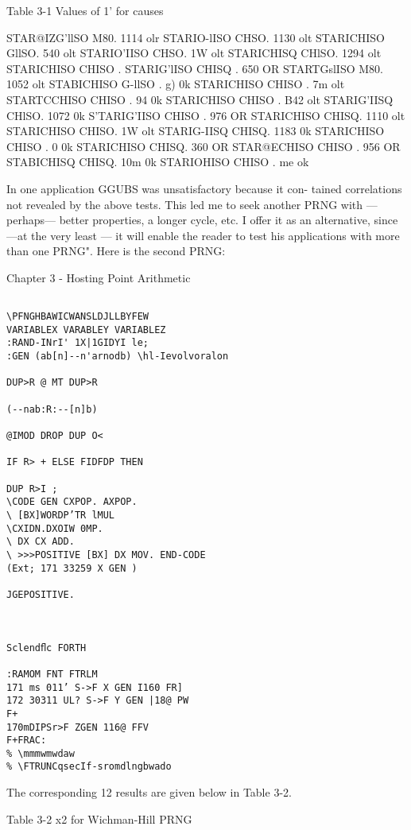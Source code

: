 Table 3-1 Values of 1' for causes

 

STAR@IZG'llSO M80. 1114 olr STARIO-lISO CHSO. 1130 olt
STARICHISO GllSO. 540 olt STARIO'IISO CHSO. 1W olt
STARICHISQ CHlSO. 1294 olt STARICHISO CHISO . %
STARIG'lISO CHISQ . 650 OR STARTGslISO M80. 1052 olt
STABICHISO G-llSO . g) 0k STARICHISO CHISO . 7m olt
STARTCCHISO CHISO . 94 0k STARICHISO CHISO . B42 olt
STARIG'IISQ CHlSO. 1072 0k S'TARIG'IISO CHISO . 976 OR
STARICHISO CHISQ. 1110 olt STARICHISO CHISO. 1W olt
STARIG-IISQ CHISQ. 1183 0k STARICHISO CHISO . $0$ 0k
STARICHISO CHISQ. 360 OR STAR@ECHISO CHISO . 956 OR
STABICHISQ CHISQ. 10m 0k STARIOHISO CHISO . me ok

 

 

 

In one application GGUBS was unsatisfactory because it con-
tained correlations not revealed by the above tests. This led me
to seek another PRNG with —perhaps— better properties, a
longer cycle, etc. I offer it as an alternative, since —at the very
least — it will enable the reader to test his applications with more
than one PRNG". Here is the second PRNG:

Chapter 3 - Hosting Point Arithmetic
\begin{verbatim}

\PFNGHBAWICWANSLDJLLBYFEW
VARIABLEX VARABLEY VARIABLEZ
:RAND-INrI' 1X|1GIDYI le;
:GEN (ab[n]--n'arnodb) \hl-Ievolvoralon

DUP>R @ MT DUP>R

(--nab:R:--[n]b)

@IMOD DROP DUP O<

IF R> + ELSE FIDFDP THEN

DUP R>I ;
\CODE GEN CXPOP. AXPOP.
\ [BX]WORDP’TR lMUL
\CXIDN.DXOIW 0MP.
\ DX CX ADD.
\ >>>POSITIVE [BX] DX MOV. END-CODE
(Ext; 171 33259 X GEN )

JGEPOSITIVE.

 

Sclendﬂc FORTH

:RAMOM FNT FTRLM
171 ms 011’ S->F X GEN I160 FR]
172 30311 UL? S->F Y GEN |18@ PW
F+
170mDIPSr>F ZGEN 116@ FFV
F+FRAC:
% \mmmwmwdaw
% \FTRUNCqsecIf-sromdlngbwado
\end{verbatim}
The corresponding 12 results are given below in Table 3-2.

Table 3-2 x2 for Wichman-Hill PRNG


